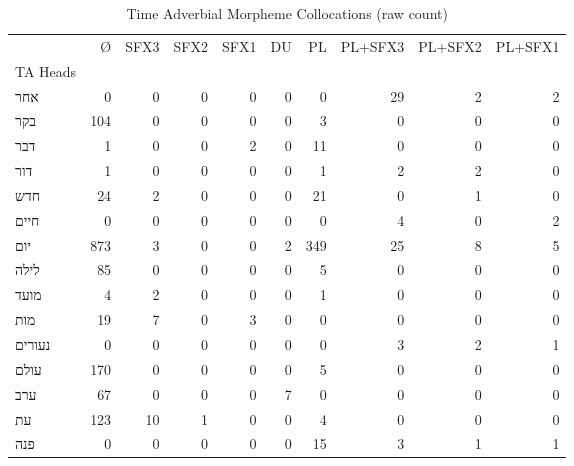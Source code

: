\begin{table}[htbp!]
\centering
\caption{Time Adverbial Morpheme Collocations (raw count)}
\label{table:morphcount}
\begin{adjustbox}{width=1\textwidth}
\begin{tabular}{lrrrrrrrrr}
\toprule
{} &    Ø &  SFX3 &  SFX2 &  SFX1 &  DU &   PL &  PL+SFX3 &  PL+SFX2 &  PL+SFX1 \\
TA Heads            &      &       &       &       &     &      &          &          &          \\
\midrule
\texthebrew{אחר}    &    0 &     0 &     0 &     0 &   0 &    0 &       29 &        2 &        2 \\
\texthebrew{בקר}    &  104 &     0 &     0 &     0 &   0 &    3 &        0 &        0 &        0 \\
\texthebrew{דבר}    &    1 &     0 &     0 &     2 &   0 &   11 &        0 &        0 &        0 \\
\texthebrew{דור}    &    1 &     0 &     0 &     0 &   0 &    1 &        2 &        2 &        0 \\
\texthebrew{חדש}    &   24 &     2 &     0 &     0 &   0 &   21 &        0 &        1 &        0 \\
\texthebrew{חיים}   &    0 &     0 &     0 &     0 &   0 &    0 &        4 &        0 &        2 \\
\texthebrew{יום}    &  873 &     3 &     0 &     0 &   2 &  349 &       25 &        8 &        5 \\
\texthebrew{לילה}   &   85 &     0 &     0 &     0 &   0 &    5 &        0 &        0 &        0 \\
\texthebrew{מועד}   &    4 &     2 &     0 &     0 &   0 &    1 &        0 &        0 &        0 \\
\texthebrew{מות}    &   19 &     7 &     0 &     3 &   0 &    0 &        0 &        0 &        0 \\
\texthebrew{נעורים} &    0 &     0 &     0 &     0 &   0 &    0 &        3 &        2 &        1 \\
\texthebrew{עולם}   &  170 &     0 &     0 &     0 &   0 &    5 &        0 &        0 &        0 \\
\texthebrew{ערב}    &   67 &     0 &     0 &     0 &   7 &    0 &        0 &        0 &        0 \\
\texthebrew{עת}     &  123 &    10 &     1 &     0 &   0 &    4 &        0 &        0 &        0 \\
\texthebrew{פנה}    &    0 &     0 &     0 &     0 &   0 &   15 &        3 &        1 &        1 \\

\end{tabular}
\end{adjustbox}
\end{table}
